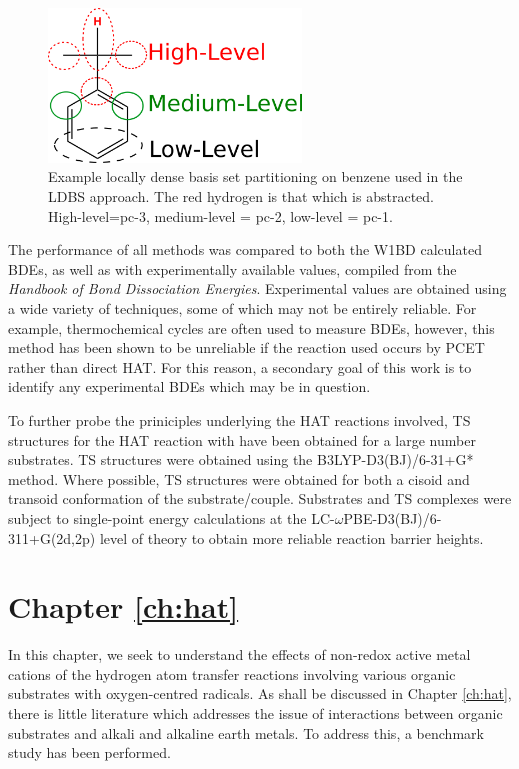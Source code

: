 \begin{figure}[htb]
  \centering
  \includegraphics[width=0.6\textwidth]{figures/ldbs}
  \caption[Example locally dense basis set partitioning on benzene used in the
  LDBS approach.]{Example locally dense basis set partitioning on benzene used
    in the LDBS approach. The red hydrogen is that which is
    abstracted. High-level=pc-3, medium-level = pc-2, low-level = pc-1.}
  \label{fig:ldbs}
\end{figure}


The performance of all methods was compared to both the W1BD calculated BDEs, as
well as with experimentally available values, compiled from the \emph{Handbook
  of Bond Dissociation Energies}.\cite{Luo2002} Experimental values are obtained
using a wide variety of techniques, some of which may not be entirely
reliable. For example, thermochemical cycles\cite{Bordwell1988} are often used
to measure BDEs, however, this method has been shown to be unreliable if the
reaction used occurs by PCET rather than direct HAT.\cite{Miller2016} For this
reason, a secondary goal of this work is to identify any experimental BDEs which
may be in question.

To further probe the priniciples underlying the HAT reactions involved, TS
structures for the HAT reaction with \cumo have been obtained for a large number
substrates. TS structures were obtained using the B3LYP-D3(BJ)/6-31+G*
method. Where possible, TS structures were obtained for both a cisoid and
transoid conformation of the substrate/\cumo couple. Substrates and TS complexes
were subject to single-point energy calculations at the
LC-$\omega$PBE-D3(BJ)/6-311+G(2d,2p) level of theory to obtain more reliable
reaction barrier heights.

\section{Chapter \ref{ch:hat}}

In this chapter, we seek to understand the effects of non-redox active metal
cations of the hydrogen atom transfer reactions involving various organic
substrates with oxygen-centred radicals. As shall be discussed in Chapter
\ref{ch:hat}, there is little literature which addresses the issue of
interactions between organic substrates and alkali and alkaline earth metals. To
address this, a benchmark study has been performed.

